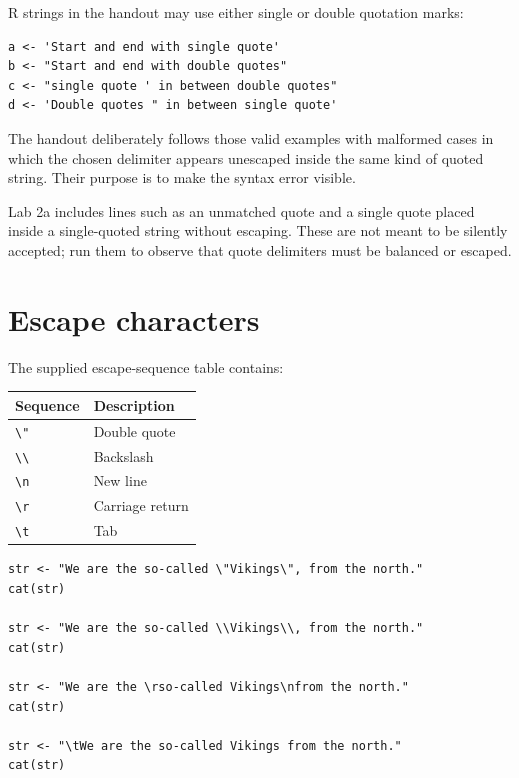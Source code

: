 R strings in the handout may use either single or double quotation marks:

\begin{lstlisting}[style=dsr]
a <- 'Start and end with single quote'
b <- "Start and end with double quotes"
c <- "single quote ' in between double quotes"
d <- 'Double quotes " in between single quote'
\end{lstlisting}

The handout deliberately follows those valid examples with malformed cases in which the chosen delimiter appears unescaped inside the same kind of quoted string. Their purpose is to make the syntax error visible.

\begin{pitfall}
Lab 2a includes lines such as an unmatched quote and a single quote placed inside a single-quoted string without escaping. These are not meant to be silently accepted; run them to observe that quote delimiters must be balanced or escaped.
\end{pitfall}

\section{Escape characters}

The supplied escape-sequence table contains:

\begin{dstable}
\begin{tabularx}{\linewidth}{@{}p{2.4cm}X@{}}
\toprule
\rowcolor{DSPaleBlue!92}
Sequence & Description \\
\midrule
\texttt{\textbackslash"} & Double quote \\
\texttt{\textbackslash\textbackslash} & Backslash \\
\texttt{\textbackslash n} & New line \\
\texttt{\textbackslash r} & Carriage return \\
\texttt{\textbackslash t} & Tab \\
\bottomrule
\end{tabularx}
\end{dstable}

\begin{lstlisting}[style=dsr]
str <- "We are the so-called \"Vikings\", from the north."
cat(str)

str <- "We are the so-called \\Vikings\\, from the north."
cat(str)

str <- "We are the \rso-called Vikings\nfrom the north."
cat(str)

str <- "\tWe are the so-called Vikings from the north."
cat(str)
\end{lstlisting}

